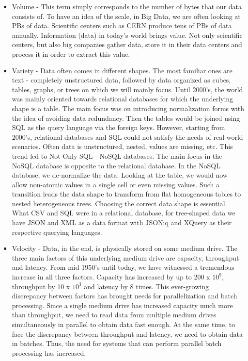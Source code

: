 \begin{itemize}
	\item Volume - This term simply corresponds to the number of bytes that our data consists of. To have an idea of the scale, in Big Data, we are often looking at PBs of data. Scientific centers such as CERN produce tens of PBs of data annually. Information (data) in today's world brings value. Not only scientific centers, but also big companies gather data, store it in their data centers and process it in order to extract this value.
	\item Variety - Data often comes in different shapes. The most familiar ones are text - completely unstructured data, followed by data organized as cubes, tables, graphs, or trees on which we will mainly focus. Until 2000's, the world was mainly oriented towards relational databases for which the underlying shape is a table. The main focus was on introducing normalization forms with the idea of avoiding data redundancy. Then the tables would be joined using SQL as the query language via the foreign keys. However, starting from 2000's, relational databases and SQL could not satisfy the needs of real-world scenarios. Often data is unstructured, nested, values are missing, etc. This trend led to Not Only SQL - NoSQL databases. The main focus in the NoSQL database is opposite to the relational database. In the NoSQL database, we de-normalize the data. Looking at the table, we would now allow non-atomic values in a single cell or even missing values. Such a transition leads the data shape to transform from flat homogeneous tables to nested heterogeneous trees. Choosing the correct data shape is essential. What CSV and SQL were in a relational database, for tree-shaped data we have JSON and XML as a data format with JSONiq and XQuery as their respective querying languages.
	\item Velocity - Data, in the end, is physically stored on some medium drive. The three main factors of this underlying medium drive are capacity, throughput and latency. From mid 1950's until today, we have witnessed a tremendous increase in all three factors. Capacity has increased by up to 200 x $10^9$, throughput by 10 x $10^3$  and latency by 8 times. This ever-growing discrepancy between factors has brought needs for parallelization and batch processing. Since a single medium drive has increased capacity much more than throughput, we need to read data from multiple medium drives simultaneously in parallel to obtain data fast enough. At the same time, to face the discrepancy between throughput and latency, we need to obtain data in batches. Thus, the need for systems that can perform parallel batch processing has increased.
\end{itemize}

